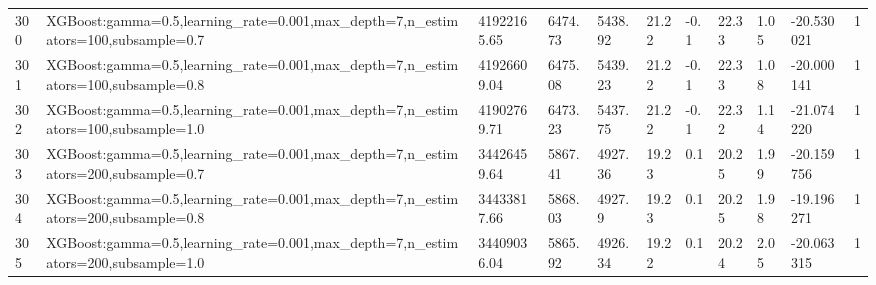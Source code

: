 \begin{longtable}{C{0.8cm} L{2cm} C{1.15cm} C{1.15cm} C{1.15cm} C{1.15cm} C{0.85cm} C{1.25cm} C{1.2cm} C{1.5cm} C{1.0cm}}
300 & XGBoost:\newline gamma=0.5,\newline learning\_rate=0.001,\newline max\_depth=7,\newline n\_estimators=100,\newline subsample=0.7 & 41922165.65 & 6474.73 & 5438.92 & 21.22 & -0.1 & 22.33 & 1.05 & -20.530021 & 1 \\
301 & XGBoost:\newline gamma=0.5,\newline learning\_rate=0.001,\newline max\_depth=7,\newline n\_estimators=100,\newline subsample=0.8 & 41926609.04 & 6475.08 & 5439.23 & 21.22 & -0.1 & 22.33 & 1.08 & -20.000141 & 1 \\
302 & XGBoost:\newline gamma=0.5,\newline learning\_rate=0.001,\newline max\_depth=7,\newline n\_estimators=100,\newline subsample=1.0 & 41902769.71 & 6473.23 & 5437.75 & 21.22 & -0.1 & 22.32 & 1.14 & -21.074220 & 1 \\
303 & XGBoost:\newline gamma=0.5,\newline learning\_rate=0.001,\newline max\_depth=7,\newline n\_estimators=200,\newline subsample=0.7 & 34426459.64 & 5867.41 & 4927.36 & 19.23 & 0.1 & 20.25 & 1.99 & -20.159756 & 1 \\
304 & XGBoost:\newline gamma=0.5,\newline learning\_rate=0.001,\newline max\_depth=7,\newline n\_estimators=200,\newline subsample=0.8 & 34433817.66 & 5868.03 & 4927.9 & 19.23 & 0.1 & 20.25 & 1.98 & -19.196271 & 1 \\
305 & XGBoost:\newline gamma=0.5,\newline learning\_rate=0.001,\newline max\_depth=7,\newline n\_estimators=200,\newline subsample=1.0 & 34409036.04 & 5865.92 & 4926.34 & 19.22 & 0.1 & 20.24 & 2.05 & -20.063315 & 1 \\

\end{longtable}
